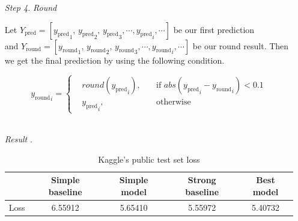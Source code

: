 \documentclass[a4paper,11pt]{article}
\begin{document}
\begin{enumerate}
\begin{enumerate}
\begin{enumerate}
			\end{enumerate}

		\item [\textit{Step 4.}] \textit{Round}

		Let $Y_{\text{pred}} = [{y_{\text{pred}}}_1,\,{y_{\text{pred}}}_2,\,{y_{\text{pred}}}_3, \cdots, {y_{\text{pred}}}_i, \cdots ]$ be our first prediction\\and $Y_{\text{round}} = [{y_{\text{round}}}_1,\,{y_{\text{round}}}_2,\,{y_{\text{round}}}_3, \cdots, {y_{\text{round}}}_i, \cdots ]$ be our round result. Then we get the final prediction by using the following condition.

			$${y_{\text{round}}}_i =
			\left\{\begin{matrix}
				&round({y_{\text{pred}}}_i),
				&\quad \text{if $abs({y_{\text{pred}}}_i - {y_{\text{round}}}_i) < 0.1$}\\
				&{y_{\text{pred}}}_i,
				&\quad \text{otherwise}
			\end{matrix}\right.$$\\

		\item [\textit{Result}].

		\begin{table}[htp]
			\begin{center}
				\begin{tabular}{| c | c | c | c | c | }
				  	\hline
			  		& Simple baseline & Simple model & Strong baseline & Best model\\[0.5ex] 
			  		\hline \hline
			  		Loss & 6.55912 & 5.65410 & 5.55972 & 5.40732\\[0.2ex]
			  		\hline
				\end{tabular}
				\caption{Kaggle's public test set loss}
			\end{center}
		\end{table}
	\end{enumerate}
\end{enumerate}
\end{document}
